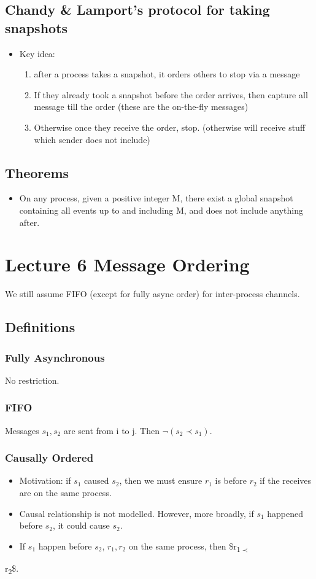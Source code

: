 \documentclass[11pt]{article}
\begin{document}
\subsection{Chandy \& Lamport's protocol for taking snapshots}
\label{sec:org31e16ab}
\begin{itemize}
\item Key idea:
\begin{enumerate}
\item after a process takes a snapshot, it orders others to stop via a message
\item If they already took a snapshot before the order arrives, then capture all
message till the order (these are the on-the-fly messages)
\item Otherwise once they receive the order, stop. (otherwise will receive stuff
which sender does not include)
\end{enumerate}
\end{itemize}
\subsection{Theorems}
\label{sec:orgd23634b}
\begin{itemize}
\item On any process, given a positive integer M, there exist a global snapshot
containing all events up to and including M, and does not include anything
after.
\end{itemize}
\section{Lecture 6 Message Ordering}
\label{sec:orgf1d1b2c}
We still assume FIFO (except for fully async order) for inter-process channels.
\subsection{Definitions}
\label{sec:orgdcf0fd9}
\subsubsection{Fully Asynchronous}
\label{sec:orgc3dd8cb}
No restriction.
\subsubsection{FIFO}
\label{sec:org4e38dbe}
Messages \(s_1,s_2\) are sent from i to j. Then \(\neg(s_2\prec s_1)\).
\subsubsection{Causally Ordered}
\label{sec:orgbff33d8}
\begin{itemize}
\item Motivation: if \(s_1\) caused \(s_2\), then we must ensure \(r_1\) is before \(r_2\)
if the receives are on the same process.
\item Causal relationship is not modelled. However, more broadly, if \(s_1\) happened
before \(s_2\), it could cause \(s_2\).
\item If \(s_1\) happen before \(s_2\), \(r_1, r_2\) on the same process, then \$r\textsubscript{1\(\prec\)}
\end{itemize}
r\textsubscript{2}\$.
\end{document}
